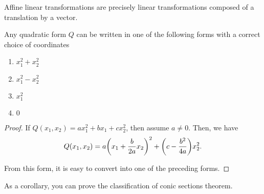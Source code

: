 Affine linear transformations are precisely linear transformations composed of a translation by a vector.

\begin{theorem}
    Any quadratic form $Q$ can be written in one of the following forms with a correct choice of coordinates
    \begin{enumerate}
        \item $x_1^2 + x_2^2$
        \item $x_1^2 - x_2^2$
        \item $x_1^2$ 
        \item $0$
    \end{enumerate} 
\end{theorem}

\begin{proof}
    If $Q(x_1, x_2) = ax_1^2 + bx_1 + cx_2^2$, then assume $a \ne 0$. Then, we have \[Q(x_1, x_2) = a\qty(x_1 + \frac{b}{2a}x_2)^2 + \qty(c- \frac{b^2}{4a})x_2^2.\]

    From this form, it is easy to convert into one of the preceding forms.
\end{proof}

As a corollary, you can prove the classification of conic sections theorem.